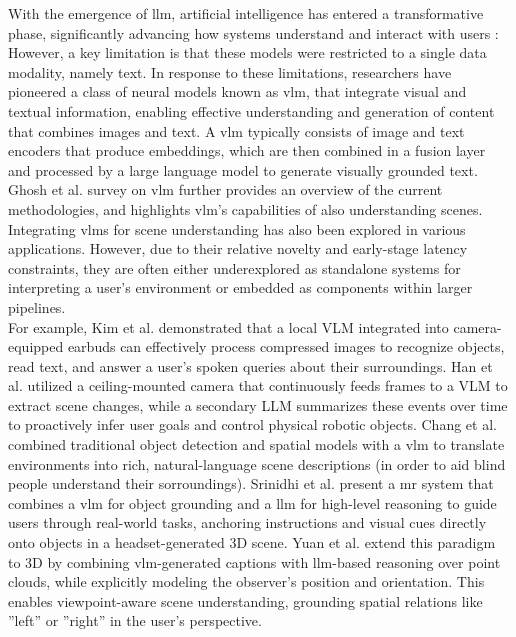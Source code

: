With the emergence of \gls{llm}, artificial intelligence has entered a transformative phase, significantly advancing how systems understand and interact with users \cite{Ghosh_24_SurveyOnVLM}: However, a key limitation is that these models were restricted to a single data modality, namely text.
In response to these limitations, researchers have pioneered a class of neural models known as \gls{vlm}, that integrate visual and textual information, enabling effective understanding and generation of content that combines images and text. A \gls{vlm} typically consists of image and text encoders that produce embeddings, which are then combined in a fusion layer and processed by a large language model to generate visually grounded text. Ghosh et al. survey on \gls{vlm} \cite{Ghosh_24_SurveyOnVLM} further provides an overview of the current methodologies, and highlights \gls{vlm}'s capabilities of also understanding scenes.\\
Integrating \glspl{vlm} for scene understanding has also been explored in various applications. However, due to their relative novelty and early-stage latency constraints, they are often either underexplored as standalone systems for interpreting a user’s environment or embedded as components within larger pipelines.\\
For example, Kim et al. \cite{Kim_26_EarbudsCamScene} demonstrated that a local VLM integrated into camera-equipped earbuds can effectively process compressed images to recognize objects, read text, and answer a user's spoken queries about their surroundings. Han et al. \cite{Han_25_PhysicalAIObjects} utilized a ceiling-mounted camera that continuously feeds frames to a VLM to extract scene changes, while a secondary LLM summarizes these events over time to proactively infer user goals and control physical robotic objects. Chang et al. \cite{Chang_24_WorldScribeLiveVisualDescriptions} combined traditional object detection and spatial models with a \gls{vlm} to translate environments into rich, natural-language scene descriptions (in order to aid blind people understand their sorroundings). Srinidhi et al. \cite{Srinidhi_24_XaiRLLM} present a \gls{mr} system that combines a \gls{vlm} for object grounding and a \gls{llm} for high-level reasoning to guide users through real-world tasks, anchoring instructions and visual cues directly onto objects in a headset-generated 3D scene. Yuan et al. \cite{Yuan_25_3DSceneUndestandingWithLLM} extend this paradigm to 3D by combining \gls{vlm}-generated captions with \gls{llm}-based reasoning over point clouds, while explicitly modeling the observer’s position and orientation. This enables viewpoint-aware scene understanding, grounding spatial relations like ''left'' or ''right'' in the user’s perspective.

